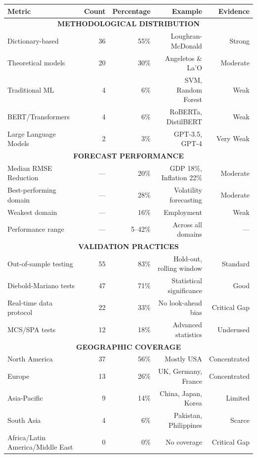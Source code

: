 \documentclass[11pt]{article}
\begin{document}
\begin{table}[H]
\centering \small
\begin{tabular}{|l|r|r|r|r|}
\hline
\textbf{Metric} & \textbf{Count} & \textbf{Percentage} & \textbf{Example} & \textbf{Evidence} \\
\hline
\multicolumn{5}{|c|}{\textbf{METHODOLOGICAL DISTRIBUTION}} \\
\hline
Dictionary-based & 36 & 55\% & Loughran-McDonald & Strong \\
Theoretical models & 20 & 30\% & Angeletos \& La'O & Moderate \\
Traditional ML & 4 & 6\% & SVM, Random Forest & Weak \\
BERT/Transformers & 4 & 6\% & RoBERTa, DistilBERT & Weak \\
Large Language Models & 2 & 3\% & GPT-3.5, GPT-4 & Very Weak \\
\hline
\multicolumn{5}{|c|}{\textbf{FORECAST PERFORMANCE}} \\
\hline
Median RMSE Reduction & — & 20\% & GDP 18\%, Inflation 22\% & Moderate \\
Best-performing domain & — & 28\% & Volatility forecasting & Moderate \\
Weakest domain & — & 16\% & Employment & Weak \\
Performance range & — & 5--42\% & Across all domains & — \\
\hline
\multicolumn{5}{|c|}{\textbf{VALIDATION PRACTICES}} \\
\hline
Out-of-sample testing & 55 & 83\% & Hold-out, rolling window & Standard \\
Diebold-Mariano tests & 47 & 71\% & Statistical significance & Good \\
Real-time data protocol & 22 & 33\% & No look-ahead bias & Critical Gap \\
MCS/SPA tests & 12 & 18\% & Advanced statistics & Underused \\
\hline
\multicolumn{5}{|c|}{\textbf{GEOGRAPHIC COVERAGE}} \\
\hline
North America & 37 & 56\% & Mostly USA & Concentrated \\
Europe & 13 & 26\% & UK, Germany, France & Concentrated \\
Asia-Pacific & 9 & 14\% & China, Japan, Korea & Limited \\
South Asia & 4 & 6\% & Pakistan, Philippines & Scarce \\
Africa/Latin America/Middle East & 0 & 0\% & No coverage & Critical Gap \\

\end{tabular}
\end{table}
\end{document}
